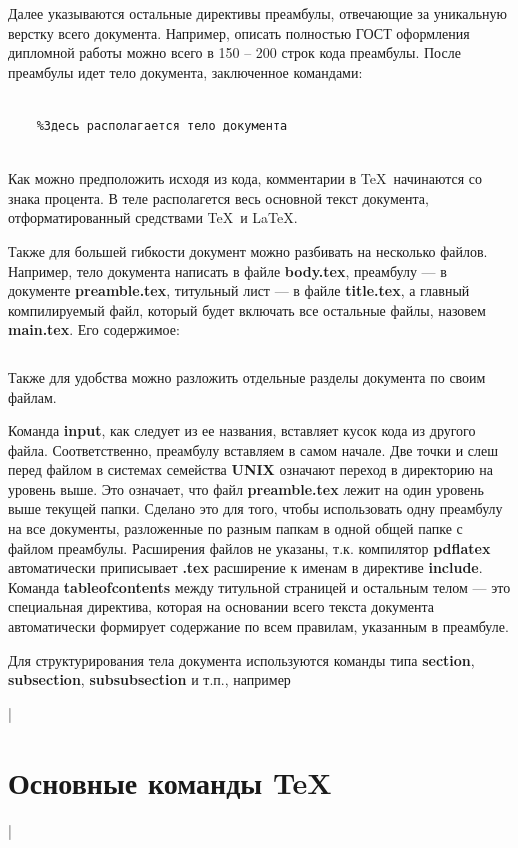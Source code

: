 Далее указываются остальные директивы преамбулы, отвечающие за уникальную верстку всего документа. Например, описать полностью ГОСТ оформления дипломной работы можно всего в 150 -- 200 строк кода преамбулы. После преамбулы идет тело документа, заключенное командами:

\begin{verbatim}
    
    %Здесь располагается тело документа
    
\end{verbatim}

Как можно предположить исходя из кода, комментарии в \TeX~начинаются со знака процента. В теле располагется весь основной текст документа, отформатированный средствами \TeX~и \LaTeX.

Также для большей гибкости документ можно разбивать на несколько файлов. Например, тело документа написать в файле \textbf{body.tex}, преамбулу --- в документе \textbf{preamble.tex}, титульный лист --- в файле \textbf{title.tex}, а главный компилируемый файл, который будет включать все остальные файлы, назовем \textbf{main.tex}. Его содержимое:

\inputminted[fontsize=\small]{latex}{main.tex}

Также для удобства можно разложить отдельные разделы документа по своим файлам.

Команда \textbf{input}, как следует из ее названия, вставляет кусок кода из другого файла. Соответственно, преамбулу вставляем в самом начале. Две точки и слеш перед файлом в системах семейства \textbf{UNIX} означают переход в директорию на уровень выше. Это означает, что файл \textbf{preamble.tex} лежит на один уровень выше текущей папки. Сделано это для того, чтобы использовать одну преамбулу на все документы, разложенные по разным папкам в одной общей папке с файлом преамбулы. Расширения файлов не указаны, т.к. компилятор \textbf{pdflatex} автоматически приписывает \textbf{.tex} расширение к именам в директиве \textbf{include}. Команда \textbf{tableofcontents} между титульной страницей и остальным телом --- это специальная директива, которая на основании всего текста документа автоматически формирует содержание по всем правилам, указанным в преамбуле.

Для структурирования тела документа используются команды типа \textbf{section}, \textbf{subsection}, \textbf{subsubsection} и т.п., например

|\section{Основные команды \TeX}|

